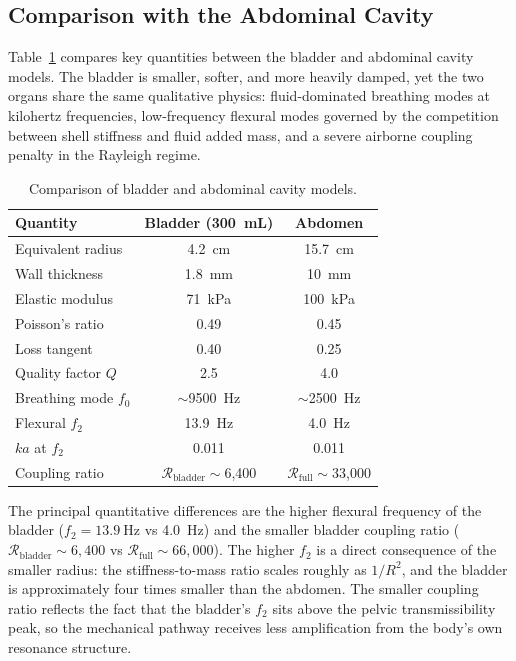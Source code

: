 \subsection{Comparison with the Abdominal Cavity}
\label{sec:comparison}

Table~\ref{tab:comparison} compares key quantities between the bladder and
abdominal cavity models.  The bladder is smaller, softer, and more heavily
damped, yet the two organs share the same qualitative physics: fluid-dominated
breathing modes at kilohertz frequencies, low-frequency flexural modes
governed by the competition between shell stiffness and fluid added mass, and
a severe airborne coupling penalty in the Rayleigh regime.

\begin{table}[htbp]
  \centering
  \caption{Comparison of bladder and abdominal cavity models.}
  \label{tab:comparison}
  \begin{tabular}{lcc}
    \toprule
    Quantity & Bladder (300~mL) & Abdomen \\
    \midrule
    Equivalent radius & \SI{4.2}{\centi\metre} & \SI{15.7}{\centi\metre} \\
    Wall thickness & \SI{1.8}{\milli\metre} & \SI{10}{\milli\metre} \\
    Elastic modulus & \SI{71}{\kilo\pascal} & \SI{100}{\kilo\pascal} \\
    Poisson's ratio & 0.49 & 0.45 \\
    Loss tangent & 0.40 & 0.25 \\
    Quality factor $Q$ & 2.5 & 4.0 \\
    Breathing mode $f_0$ & $\sim$\SI{9500}{\hertz} & $\sim$\SI{2500}{\hertz} \\
    Flexural $f_2$ & \SI{13.9}{\hertz} & \SI{4.0}{\hertz} \\
    $ka$ at $f_2$ & 0.011 & 0.011 \\
    Coupling ratio & $\mathcal{R}_\mathrm{bladder} \sim$6,400 & $\mathcal{R}_\mathrm{full} \sim$33,000 \\
    \bottomrule
  \end{tabular}
\end{table}

The principal quantitative differences are the higher flexural frequency of
the bladder ($f_2 = \SI{13.9}{\hertz}$ vs \SI{4.0}{\hertz}) and the smaller
bladder coupling ratio ($\mathcal{R}_\mathrm{bladder} \sim 6{,}400$ vs
$\mathcal{R}_\mathrm{full} \sim 66{,}000$).  The higher $f_2$ is a direct
consequence of the smaller radius: the stiffness-to-mass ratio scales
roughly as $1/R^2$, and the bladder is approximately four times smaller
than the abdomen.  The smaller coupling ratio reflects the fact that the
bladder's $f_2$ sits above the pelvic transmissibility peak, so the
mechanical pathway receives less amplification from the body's own
resonance structure.
